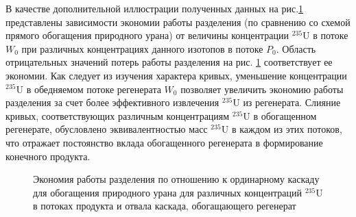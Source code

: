 В качестве дополнительной иллюстрации полученных данных на рис.\ref{Figure_13} представлены зависимости экономии работы разделения (по сравнению со схемой прямого обогащения природного урана) от величины концентрации $^{235}$U в потоке $W_0$ при различных концентрациях данного изотопов в потоке $P_0$. Область отрицательных значений потерь работы разделения на рис. \ref{Figure_13} соответствует ее экономии. Как следует из изучения характера кривых, уменьшение концентрации $^{235}$U в обедняемом потоке регенерата $W_0$ позволяет увеличить экономию работы разделения за счет более эффективного извлечения $^{235}$U из регенерата. Слияние кривых, соответствующих различным концентрациям $^{235}$U в обогащенном регенерате, обусловлено эквивалентностью масс $^{235}$U в каждом из этих потоков, что отражает постоянство вклада обогащенного регенерата в формирование конечного продукта.



\begin{figure}[ht]
  \caption{Экономия работы разделения по отношению к ординарному каскаду для обогащения природного урана для различных концентраций $^{235}$U в потоках продукта и отвала каскада, обогащающего регенерат}\label{Figure_13}
\end{figure}


